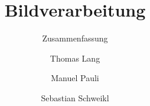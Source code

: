 



\title{Bildverarbeitung}
\subtitle{Zusammenfassung}
\author{Thomas Lang\and{}Manuel Pauli\and{}Sebastian Schweikl}

\maketitle

\tableofcontents








\backmatter
\appendix
\appendixpage
\addappheadtotoc
\renewcommand{\thesection}{\Alph{section}}




